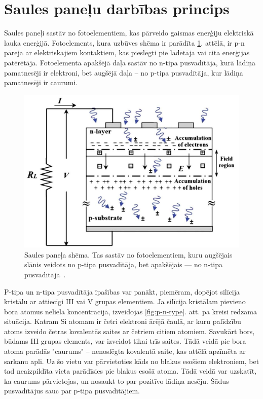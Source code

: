 \section{Saules paneļu darbības princips}

Saules paneļi sastāv no fotoelementiem, kas pārveido gaismas enerģiju elektriskā lauka enerģijā. Fotoelements, kura uzbūves shēma ir parādīta \ref{fig:PV}. attēlā, ir p-n pāreja ar elektriskajiem kontaktiem, kas pieslēgti pie lādētāja vai cita enerģijas patērētāja. Fotoelementa apakšējā daļa sastāv no n-tipa pusvadītāja, kurā lādiņa pamatnesēji ir elektroni, bet augšējā daļa -- no p-tipa pusvadītāja, kur lādiņa pamatnesēji ir caurumi. 

\begin{figure}[h]
    \centering
    \includegraphics[width=0.6\linewidth]{figures/misc/PV.jpg}
    \caption{Saules paneļa shēma. Tas sastāv no fotoelementiem, kuru augšējais slānis veidots no p-tipa pusvadītāja, bet apakšējais --- no n-tipa pusvadītāja~\cite{Yahyaoui}.}
    \label{fig:PV}
\end{figure}

P-tipa un n-tipa pusvadītāja īpašības var panākt, piemēram, dopējot silīcija kristālu ar attiecīgi III vai V grupas elementiem. Ja silīcija kristālam pievieno bora atomus nelielā koncentrācijā, izveidojas \ref{fig:p-n-type}. att. pa kreisi redzamā situācija. Katram Si atomam ir četri elektroni ārējā čaulā, ar kuru palīdzību atoms izveido četras kovalentās saites ar četriem citiem atomiem. Savukārt bors, būdams III grupas elements, var izveidot tikai trīs saites. Tādā veidā pie bora atoma parādās "caurums" -- nenoslēgta kovalentā saite, kas attēlā apzīmēta ar sarkanu apli. Uz šo vietu var pārvietoties kāds no blakus esošiem elektroniem, bet tad neaizpildīta vieta parādīsies pie blakus esošā atoma. Tādā veidā var uzskatīt, ka caurums pārvietojas, un nosaukt to par pozitīvo lādiņa nesēju. Šādus pusvadītājus sauc par p-tipa pusvadītājiem. ~\cite{Yahyaoui}


